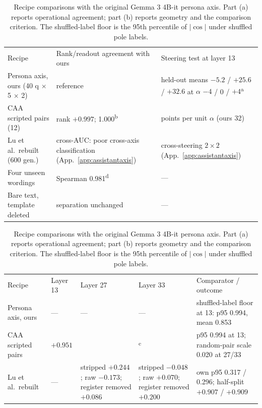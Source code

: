 \begin{table}[t]
\caption{Recipe comparisons with the original Gemma 3 4B-it persona axis.
Part (a) reports operational agreement; part (b) reports geometry and the
comparison criterion. The shuffled-label floor is the 95th percentile of
$|\cos|$ under shuffled pole labels.}
\label{tab:recipes}
\centering
\scriptsize
\setlength{\tabcolsep}{2pt}
\begin{tabular}{@{}>{\raggedright\arraybackslash}p{1.0in}>{\raggedright\arraybackslash}p{2.15in}>{\raggedright\arraybackslash}p{2.05in}@{}}
\multicolumn{3}{@{}l}{\textit{(a) Operational agreement}} \\
\toprule
Recipe & Rank/readout agreement with ours & Steering test at layer 13 \\
\midrule
Persona axis, ours (40 q $\times$ 5 $\times$ 2) & reference & held-out means $-5.2$ / $+25.6$ / $+32.6$ at $\alpha$ $-4$ / 0 / $+4$\textsuperscript{a} \\
CAA scripted pairs (12) & rank $+0.997$; 1.000\textsuperscript{b} & 33 points per unit $\alpha$ (ours 32) \\
Lu et al.\ rebuilt (600 gen.) & cross-AUC: poor cross-axis classification (App.~\ref{app:assistantaxis}) & cross-steering $2\times2$ (App.~\ref{app:assistantaxis}) \\
Four unseen wordings & Spearman 0.981\textsuperscript{d} & --- \\
Bare text, template deleted & separation unchanged & --- \\
\bottomrule
\end{tabular}
\par\smallskip
\begin{tabular}{@{}>{\raggedright\arraybackslash}p{0.9in}>{\raggedright\arraybackslash}p{0.65in}>{\raggedright\arraybackslash}p{1.02in}>{\raggedright\arraybackslash}p{1.02in}>{\raggedright\arraybackslash}p{1.25in}@{}}
\multicolumn{5}{@{}l}{\textit{(b) Geometry and comparison criteria}} \\
\toprule
Recipe & Layer 13 & Layer 27 & Layer 33 & Comparator / outcome \\
\midrule
Persona axis, ours & --- & --- & --- & shuffled-label floor at 13: p95 0.994, mean 0.853 \\
CAA scripted pairs & $+0.951$ & 0.016 & 0.011\textsuperscript{c} & p95 0.994 at 13; random-pair scale 0.020 at 27/33 \\
Lu et al.\ rebuilt & --- & stripped $+0.244$; raw $-0.173$; register removed $+0.086$ & stripped $-0.048$; raw $+0.070$; register removed $+0.200$ & own p95 0.317 / 0.296; half-split $+0.907$ / $+0.909$ \\

\end{tabular}
\end{table}
